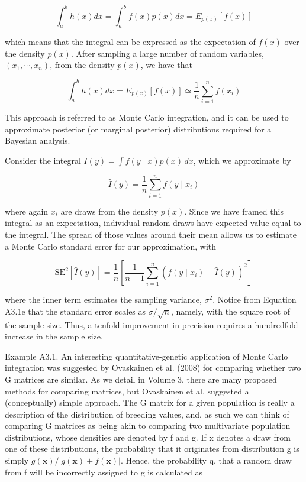 \documentclass{article}
\begin{document}
\begin{equation}
\int_{a}^{b}h(x)dx=\int_{a}^{b}f(x)p(x)dx=E_{p(x)}[f(x)]
\end{equation}

which means that the integral can be expressed as the expectation of $f(x)$ over the density $p(x)$. After sampling a large number of random variables, $(x_{1},\cdots,x_{n})$, from the density $p(x)$, we have that

\begin{equation}
\int_{a}^{b}h(x)dx=E_{p(x)}[f(x)]\simeq\frac{1}{n}\sum_{i=1}^{n}f(x_{i})
\end{equation}

This approach is referred to as Monte Carlo integration, and it can be used to approximate posterior (or marginal posterior) distributions required for a Bayesian analysis.

Consider the integral  $ I(y) = \int f(y \mid x) p(x) \, dx $, which we approximate by

\begin{equation}
\widehat{I}(y)=\frac{1}{n}\sum_{i=1}^{n}f(y\mid x_{i})
\end{equation}

where again  $ x_{i} $ are draws from the density  $ p(x) $. Since we have framed this integral as an expectation, individual random draws have expected value equal to the integral. The spread of those values around their mean allows us to estimate a Monte Carlo standard error for our approximation, with

\begin{equation}
\mathrm{SE}^{2}[\widehat{I}(y)]=\frac{1}{n}\left[\frac{1}{n-1}\sum_{i=1}^{n}\left(f(y\mid x_{i})-\widehat{I}(y)\right)^{2}\right]
\end{equation}

where the inner term estimates the sampling variance,  $ \sigma^2 $. Notice from Equation A3.1e that the standard error scales as  $ \sigma/\sqrt{n} $, namely, with the square root of the sample size. Thus, a tenfold improvement in precision requires a hundredfold increase in the sample size.

Example A3.1. An interesting quantitative-genetic application of Monte Carlo integration was suggested by Ovaskainen et al. (2008) for comparing whether two G matrices are similar. As we detail in Volume 3, there are many proposed methods for comparing matrices, but Ovaskainen et al. suggested a (conceptually) simple approach. The G matrix for a given population is really a description of the distribution of breeding values, and, as such we can think of comparing G matrices as being akin to comparing two multivariate population distributions, whose densities are denoted by f and g. If x denotes a draw from one of these distributions, the probability that it originates from distribution g is simply  $ g(\mathbf{x}) / |g(\mathbf{x}) + f(\mathbf{x})| $. Hence, the probability q, that a random draw from f will be incorrectly assigned to g is calculated as
\end{document}
